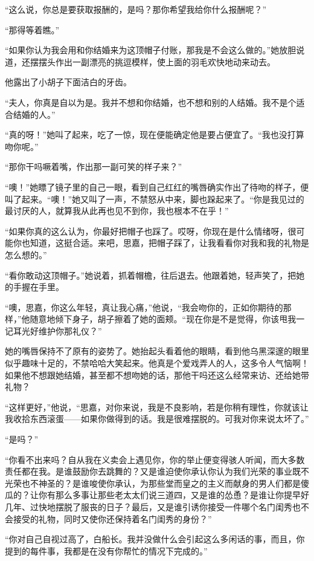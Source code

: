 \par “这么说，你总是要获取报酬的，是吗？那你希望我给你什么报酬呢？”
\par “那得等着瞧。”
\par “如果你认为我会用和你结婚来为这顶帽子付账，那我是不会这么做的。”她放胆说道，还摆摆头作出一副漂亮的挑逗模样，使上面的羽毛欢快地动来动去。
\par 他露出了小胡子下面洁白的牙齿。
\par “夫人，你真是自以为是。我并不想和你结婚，也不想和别的人结婚。我不是个适合结婚的人。”
\par “真的呀！”她叫了起来，吃了一惊，现在便能确定他是要占便宜了。“我也没打算吻你呢。”
\par “那你干吗噘着嘴，作出那一副可笑的样子来？”
\par “噢！”她瞟了镜子里的自己一眼，看到自己红红的嘴唇确实作出了待吻的样子，便叫了起来。“噢！”她又叫了一声，不禁怒从中来，脚也跺起来了。“你是我见过的最讨厌的人，就算我从此再也见不到你，我也根本不在乎！”
\par “如果你真的这么认为，你最好把帽子也踩了。哎呀，你现在是什么情绪呀，很可能你也知道，这挺合适。来吧，思嘉，把帽子踩了，让我看看你对我和我的礼物是怎么想的。”
\par “看你敢动这顶帽子。”她说着，抓着帽檐，往后退去。他跟着她，轻声笑了，把她的手握在手里。
\par “噢，思嘉，你这么年轻，真让我心痛，”他说，“我会吻你的，正如你期待的那样，”他随意地倾下身子，胡子擦着了她的面颊。“现在你是不是觉得，你该甩我一记耳光好维护你那礼仪？”
\par 她的嘴唇保持不了原有的姿势了。她抬起头看着他的眼睛，看到他乌黑深邃的眼里似乎趣味十足的，不禁哈哈大笑起来。他真是个爱戏弄人的人，这多令人气恼啊！如果他不想跟她结婚，甚至都不想吻她的话，那他干吗还这么经常来访、还给她带礼物？
\par “这样更好，”他说，“思嘉，对你来说，我是不良影响，若是你稍有理性，你就该让我收拾东西滚蛋——如果你做得到的话。我是很难摆脱的。可我对你来说太坏了。”
\par “是吗？”
\par “你看不出来吗？自从我在义卖会上遇见你，你的举止便变得骇人听闻，而大多数责任都在我。是谁鼓励你去跳舞的？又是谁迫使你承认你认为我们光荣的事业既不光荣也不神圣的？是谁唆使你承认，为那些堂而皇之的主义而献身的男人们都是傻瓜的？让你有那么多事让那些老太太们说三道四，又是谁的怂恿？是谁让你提早好几年、过快地摆脱了服丧的日子？最后，又是谁引诱你接受一件哪个名门闺秀也不会接受的礼物，同时又使你还保持着名门闺秀的身份？”
\par “你对自己自视过高了，白船长。我并没做什么会引起这么多闲话的事，而且，你提到的每件事，我都是在没有你帮忙的情况下完成的。”

